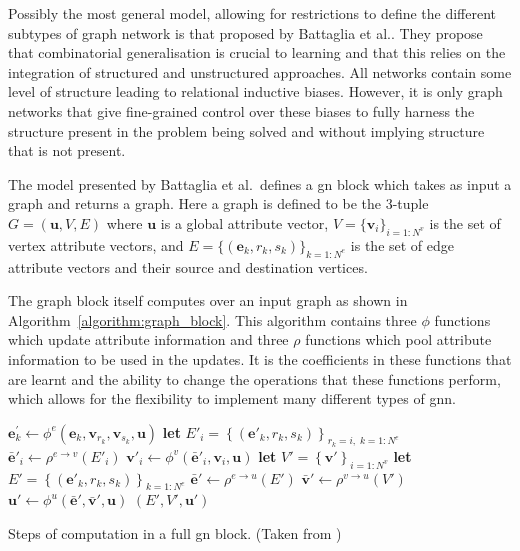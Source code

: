 Possibly the most general model, allowing for restrictions to define the different subtypes of graph network is that proposed by Battaglia et al.\cite{battaglia2018relational}. They propose that combinatorial generalisation is crucial to learning and that this relies on the integration of structured and unstructured approaches. All networks contain some level of structure leading to relational inductive biases. However, it is only graph networks that give fine-grained control over these biases to fully harness the structure present in the problem being solved and without implying structure that is not present.

The model presented by Battaglia et al.\ defines a \ac{gn} block which takes as input a graph and returns a graph. Here a graph is defined to be the 3-tuple $G = (\bm{u}, V, E)$ where $\bm{u}$ is a global attribute vector, $V = \{\bm{v}_i\}_{i=1:N^v}$ is the set of vertex attribute vectors, and $E = \{(\bm{e}_k, r_k, s_k)\}_{k=1:N^e}$ is the set of edge attribute vectors and their source and destination vertices.

The graph block itself computes over an input graph as shown in Algorithm~\ref{algorithm:graph_block}. This algorithm contains three $\phi$ functions which update attribute information and three $\rho$ functions which pool attribute information to be used in the updates. It is the coefficients in these functions that are learnt and the ability to change the operations that these functions perform, which allows for the flexibility to implement many different types of \ac{gnn}.

\begin{algorithm}[t]
\small
\begin{algorithmic}
        \State $\mathbf{e}_k^\prime\gets \phi^e\left(\mathbf{e}_k, \mathbf{v}_{r_k}, \mathbf{v}_{s_k}, \mathbf{u} \right)$
    \EndFor
        \State \textbf{let} $E'_i = \left\{\left(\mathbf{e}'_k, r_k, s_k \right)\right\}_{r_k=i,\; k=1:N^e}$
        \State $\mathbf{\bar{e}}'_i \gets \rho^{e \rightarrow v}\left(E'_i\right)$
        \State $\mathbf{v}'_i \gets \phi^v\left(\mathbf{\bar{e}}'_i, \mathbf{v}_i, \mathbf{u}\right)$
    \EndFor
    \State \textbf{let} $V' = \left\{\mathbf{v}'\right\}_{i=1:N^v}$
    \State \textbf{let} $E' = \left\{\left(\mathbf{e}'_k, r_k, s_k \right)\right\}_{k=1:N^e}$
    \State $\mathbf{\bar{e}}' \gets \rho^{e \rightarrow u}\left(E'\right)$
    \State $\mathbf{\bar{v}}' \gets \rho^{v \rightarrow u}\left(V'\right)$
    \State $\mathbf{u}' \gets \phi^u\left(\mathbf{\bar{e}}', \mathbf{\bar{v}}', \mathbf{u}\right)$
    \State \Return $(E', V', \mathbf{u}')$
\EndFunction
\end{algorithmic}
\caption{Steps of computation in a full \ac{gn} block. (Taken from \cite{battaglia2018relational})}
\label{algorithm:graph_block}
\end{algorithm}


